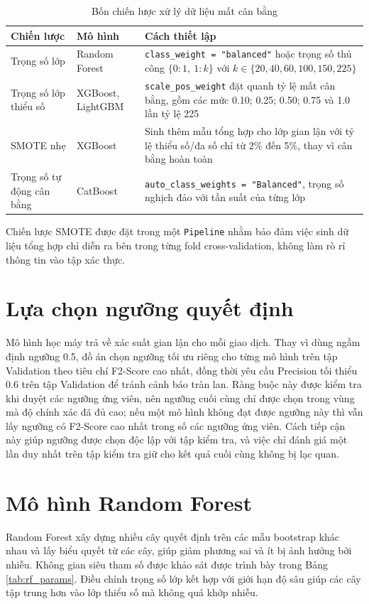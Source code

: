 \begin{table}[H]
\centering
\fontsize{11}{13.6}\selectfont
\renewcommand{\arraystretch}{1.2}
\setlength{\tabcolsep}{6pt}
\begin{tabularx}{\textwidth}{|p{3.4cm}|p{2.8cm}|X|}
\hline
\textbf{Chiến lược} & \textbf{Mô hình} & \textbf{Cách thiết lập} \\
\hline
Trọng số lớp & Random Forest & \texttt{class\_weight = "balanced"} hoặc trọng số thủ công $\{0{:}1,\ 1{:}k\}$ với $k \in \{20, 40, 60, 100, 150, 225\}$ \\
\hline
Trọng số lớp thiểu số & XGBoost, LightGBM & \texttt{scale\_pos\_weight} đặt quanh tỷ lệ mất cân bằng, gồm các mức 0{.}10; 0{.}25; 0{.}50; 0{.}75 và 1{.}0 lần tỷ lệ 225 \\
\hline
SMOTE nhẹ \cite{chawla2002smote} & XGBoost & Sinh thêm mẫu tổng hợp cho lớp gian lận với tỷ lệ thiểu số/đa số chỉ từ 2\% đến 5\%, thay vì cân bằng hoàn toàn \\
\hline
Trọng số tự động cân bằng & CatBoost & \texttt{auto\_class\_weights = "Balanced"}, trọng số nghịch đảo với tần suất của từng lớp \\
\hline
\end{tabularx}
\caption{Bốn chiến lược xử lý dữ liệu mất cân bằng}
\label{tab:imbalance}
\end{table}

Chiến lược SMOTE được đặt trong một \texttt{Pipeline} nhằm bảo đảm việc sinh dữ liệu tổng hợp chỉ diễn ra bên trong từng fold cross-validation, không làm rò rỉ thông tin vào tập xác thực.

\section{Lựa chọn ngưỡng quyết định}
Mô hình học máy trả về xác suất gian lận cho mỗi giao dịch. Thay vì dùng ngầm định ngưỡng 0{.}5, đồ án chọn ngưỡng tối ưu riêng cho từng mô hình trên tập Validation theo tiêu chí F2-Score cao nhất, đồng thời yêu cầu Precision tối thiểu 0{.}6 trên tập Validation để tránh cảnh báo tràn lan. Ràng buộc này được kiểm tra khi duyệt các ngưỡng ứng viên, nên ngưỡng cuối cùng chỉ được chọn trong vùng mà độ chính xác đã đủ cao; nếu một mô hình không đạt được ngưỡng này thì vẫn lấy ngưỡng có F2-Score cao nhất trong số các ngưỡng ứng viên. Cách tiếp cận này giúp ngưỡng được chọn độc lập với tập kiểm tra, và việc chỉ đánh giá một lần duy nhất trên tập kiểm tra giữ cho kết quả cuối cùng không bị lạc quan.

\section{Mô hình Random Forest}
Random Forest \cite{breiman2001randomforest} xây dựng nhiều cây quyết định trên các mẫu bootstrap khác nhau và lấy biểu quyết từ các cây, giúp giảm phương sai và ít bị ảnh hưởng bởi nhiễu. Không gian siêu tham số được khảo sát được trình bày trong Bảng \ref{tab:rf_params}. Điều chỉnh trọng số lớp kết hợp với giới hạn độ sâu giúp các cây tập trung hơn vào lớp thiểu số mà không quá khớp nhiễu.

